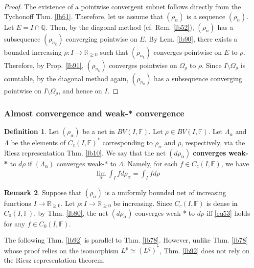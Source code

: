 \documentclass[12pt,b5paper,notitlepage]{article}
\theoremstyle{definition}
\newtheorem{df}{Definition}[section]
\newtheorem{rem}[df]{Remark}
\theoremstyle{plain}
\newcommand{\Qbb}{\mathbb Q}
\newcommand{\Rbb}{\mathbb R}
\newcommand{\Fbb}{\mathbb F}
\numberwithin{equation}{section}
\begin{document}
\begin{proof}
The existence of a pointwise convergent subnet follows directly from the Tychonoff Thm. \ref{lb61}. Therefore, let us assume that $(\rho_\alpha)$ is a sequence $(\rho_n)$. Let $E=I\cap\Qbb$. Then, by the diagonal method (cf. Rem. \ref{lb52}), $(\rho_n)$ has a subsequence $(\rho_{n_k})$ converging pointwise on $E$. By Lem. \ref{lb90}, there exists a bounded increasing $\rho:I\rightarrow\Rbb_{\geq0}$ such that $(\rho_{n_k})$ converges pointwise on $E$ to $\rho$. Therefore, by Prop. \ref{lb91}, $(\rho_{n_k})$ converges pointwise on $\Omega_\rho$ to $\rho$. Since $I\setminus\Omega_\rho$ is countable, by the diagonal method again, $(\rho_{n_k})$ has a subsequence converging pointwise on $I\setminus\Omega_\rho$, and hence on $I$. 
\end{proof}



\subsubsection{Almost convergence and weak-* convergence}

\begin{df}
Let $(\rho_\alpha)$ be a net in $BV(I,\Fbb)$. Let $\rho\in BV(I,\Fbb)$. Let $\Lambda_\alpha$ and $\Lambda$ be the elements of $C_c(I,\Fbb)^*$ corresponding to $\rho_\alpha$ and $\rho$, respectively, via the Riesz representation Thm. \ref{lb10}.  We say that the net $(d\rho_\alpha)$ \textbf{converges weak-*}  to $d\rho$ if $(\Lambda_\alpha)$ converges weak-* to $\Lambda$. Namely, for each $f\in C_c(I,\Fbb)$, we have
\begin{align}\label{eq53}
\lim_\alpha \int_I f d\rho_\alpha=\int_I fd\rho
\end{align}
\end{df}

\begin{rem}\label{lb186}
Suppose that $(\rho_\alpha)$ is a uniformly bounded net of increasing functions $I\rightarrow\Rbb_{\geq0}$. Let $\rho:I\rightarrow\Rbb_{\geq0}$ be increasing.  Since $C_c(I,\Fbb)$ is dense in $C_0(I,\Fbb)$, by Thm. \ref{lb80}, the net $(d\rho_\alpha)$ converges weak-* to $d\rho$ iff \eqref{eq53} holds for any $f\in C_0(I,\Fbb)$.
\end{rem}

The following Thm. \ref{lb92} is parallel to Thm. \ref{lb78}. However, unlike Thm. \ref{lb78} whose proof relies on the isomorphism $L^p\simeq(L^q)^*$, Thm. \ref{lb92} does not rely on the Riesz representation theorem.
\end{document}
